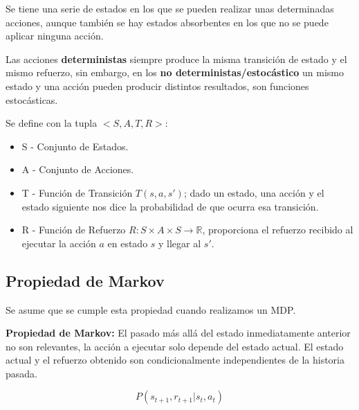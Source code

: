 \documentclass[12pt]{report} %
\begin{document}
Se tiene una serie de estados en los que se pueden realizar unas determinadas acciones, aunque también se hay estados absorbentes en los que no se puede aplicar ninguna acción.

Las acciones \textbf{deterministas} siempre produce la misma transición de estado y el mismo refuerzo, sin embargo, en los \textbf{no deterministas/estocástico} un mismo estado y una acción pueden producir distintos resultados, son funciones estocásticas.

Se define con la tupla $<S, A, T, R>$:
\begin{itemize}
  \item S - Conjunto de Estados.
  \item A - Conjunto de Acciones.
  \item T - Función de Transición $T(s, a, s')$; dado un estado, una acción y el estado siguiente nos dice la probabilidad de que ocurra esa transición.
  \item R - Función de Refuerzo $R: S \times A \times S \rightarrow \mathbb{R}$, proporciona el refuerzo recibido al ejecutar la acción $a$ en estado $s$ y llegar al $s'$.
\end{itemize}

\subsection{Propiedad de Markov}
Se asume que se cumple esta propiedad cuando realizamos un MDP.

\textbf{Propiedad de Markov:} El pasado más allá del estado inmediatamente anterior no son relevantes, la acción a ejecutar solo depende del estado actual. El estado actual y el refuerzo obtenido son condicionalmente independientes de la historia pasada.

$$P(s_{t+1}, r_{t+1}| s_t,a_t)$$
\end{document}
